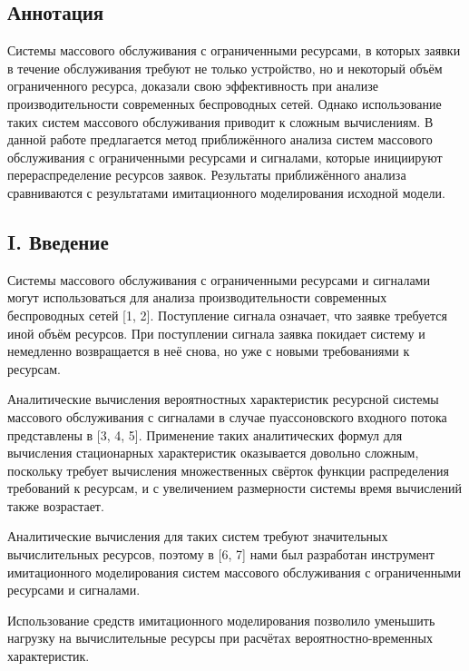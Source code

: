 \hypertarget{ux430ux43dux43dux43eux442ux430ux446ux438ux44f}{%
\subsection{Аннотация}\label{ux430ux43dux43dux43eux442ux430ux446ux438ux44f}}

Системы массового обслуживания с ограниченными ресурсами, в которых
заявки в течение обслуживания требуют не только устройство, но и
некоторый объём ограниченного ресурса, доказали свою эффективность при
анализе производительности современных беспроводных сетей. Однако
использование таких систем массового обслуживания приводит к сложным
вычислениям. В данной работе предлагается метод приближённого анализа
систем массового обслуживания с ограниченными ресурсами и сигналами,
которые инициируют перераспределение ресурсов заявок. Результаты
приближённого анализа сравниваются с результатами имитационного
моделирования исходной модели.

\hypertarget{i.-ux432ux432ux435ux434ux435ux43dux438ux435}{%
\subsection{I.
Введение}\label{i.-ux432ux432ux435ux434ux435ux43dux438ux435}}

Системы массового обслуживания с ограниченными ресурсами и сигналами
могут использоваться для анализа производительности современных
беспроводных сетей {[}1, 2{]}. Поступление сигнала означает, что заявке
требуется иной объём ресурсов. При поступлении сигнала заявка покидает
систему и немедленно возвращается в неё снова, но уже с новыми
требованиями к ресурсам.

Аналитические вычисления вероятностных характеристик ресурсной системы
массового обслуживания с сигналами в случае пуассоновского входного
потока представлены в {[}3, 4, 5{]}. Применение таких аналитических
формул для вычисления стационарных характеристик оказывается довольно
сложным, поскольку требует вычисления множественных свёрток функции
распределения требований к ресурсам, и с увеличением размерности системы
время вычислений также возрастает.

Аналитические вычисления для таких систем требуют значительных
вычислительных ресурсов, поэтому в {[}6, 7{]} нами был разработан
инструмент имитационного моделирования систем массового обслуживания с
ограниченными ресурсами и сигналами.

Использование средств имитационного моделирования позволило уменьшить
нагрузку на вычислительные ресурсы при расчётах вероятностно-временных
характеристик.

